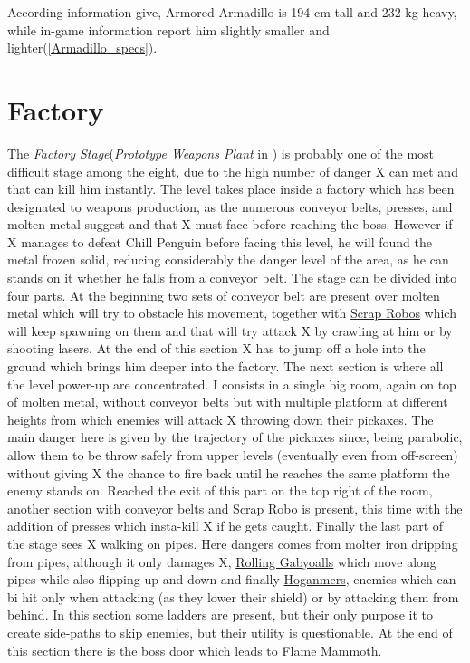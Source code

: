 According information give, Armored Armadillo is 194 cm tall and 232 kg heavy, while in-game information report him slightly smaller and lighter(\ref{Armadillo_specs}).
\section{Factory} %
The \textit{Factory Stage}(\textit{Prototype Weapons Plant} in \mhx)  is probably one of the most difficult stage among the eight, due to the high number of danger X can met and that can kill him instantly. The level takes place inside a factory which has been designated to weapons production, as the numerous conveyor belts, presses, and molten metal suggest and that X must face before reaching the boss. However if X manages to defeat Chill Penguin before facing this level, he will found the metal frozen solid, reducing considerably the danger level of the area, as he can stands on it whether he falls from a conveyor belt.
The stage can be divided into four parts. At the beginning two sets of conveyor belt are present over molten metal which will try to obstacle his movement, together with  \hyperlink{enem:Scrap_Robo}{Scrap Robos} which will keep spawning on them and that will try attack X by crawling at him or by shooting lasers. At the end of this section X has to jump off a hole into the ground which brings him deeper into the factory. The next section is where all the level power-up are concentrated. I consists in a single big room, again on top of molten metal, without conveyor belts but with multiple platform at different heights from which enemies will attack X throwing down their pickaxes. The main danger here is given by the trajectory of the pickaxes since, being parabolic, allow them to be throw safely from upper levels (eventually even from off-screen) without giving X the chance to fire back until he reaches the same platform the enemy stands on. Reached the exit of this part on the top right of the room, another section with conveyor belts and Scrap Robo is present, this time with the addition of presses which insta-kill X if he gets caught. Finally the last part of the stage sees X walking on pipes. Here dangers comes from molter iron dripping from pipes, although it only damages X,  \hyperlink{enem:Rolling_Gabyoall}{Rolling Gabyoalls} which move along pipes while also flipping up and down and finally \hyperlink{enem:Hoganmer}{Hoganmers}, enemies which can bi hit only when attacking (as they lower their shield) or by attacking them from behind. In this section some ladders are present, but their only purpose it to create side-paths to skip enemies, but their utility is questionable. At the end of this section there is the boss door which leads to Flame Mammoth.

